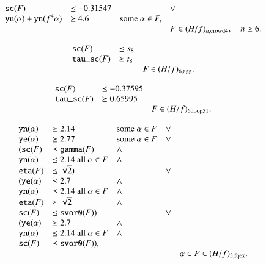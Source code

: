 \begin{equation}
    \begin{array}{lllll}
        {\operatorname{{\texttt{sc}}}}(F) &\preceq -0.31547&&\vee\\
        {\operatorname{{\texttt{yn}}}}(\alpha) + {\operatorname{{\texttt{yn}}}}(f^4\alpha) &\succeq 4.6 &\text{some
        }\alpha\in F,\\
        &&&F\in (H/f)_{n,{\operatorname{crowd4}}},\quad n\ge 6.
    \end{array}
\end{equation}

\begin{equation}
    \begin{array}{llll}
        {\operatorname{{\texttt{sc}}}}(F) &\preceq s_8\\
        {\operatorname{{\texttt{tau\_sc}}}}(F) &\succeq t_8\\
        &&F\in (H/f)_{6,{\operatorname{agg}}}.
    \end{array}
\end{equation}

\begin{equation}
    \begin{array}{llll}
        {\operatorname{{\texttt{sc}}}}(F) &\preceq -0.37595\\
        {\operatorname{{\texttt{tau\_sc}}}}(F) &\succeq 0.65995\\
        &&F\in (H/f)_{6,{\operatorname{loop51}}}.
    \end{array}
\end{equation}





\begin{equation}
    \begin{array}{lllll}
        {\operatorname{{\texttt{yn}}}}(\alpha) &\succeq 2.14 &\text{some }\alpha\in F&\vee\\
        {\operatorname{{\texttt{ye}}}}(\alpha) &\succeq 2.77 &\text{some }\alpha\in
        F&\vee\\
        ({\operatorname{{\texttt{sc}}}}(F) &\preceq {\operatorname{{\texttt{gamma}}}}(F) &\wedge\\
         {\operatorname{{\texttt{yn}}}}(\alpha) &\preceq 2.14 \text{ all }\alpha\in
         F&\wedge\\
        {\operatorname{{\texttt{eta}}}}(F) &\preceq \sqrt2) &&\vee\\
        ({\operatorname{{\texttt{ye}}}}(\alpha) &\preceq 2.7 &\wedge\\
        {\operatorname{{\texttt{yn}}}}(\alpha) &\preceq 2.14 \text{ all }\alpha\in
         F&\wedge\\
        {\operatorname{{\texttt{eta}}}}(F) &\succeq \sqrt2 &\wedge\\
        {\operatorname{{\texttt{sc}}}}(F) &\preceq {\operatorname{{\texttt{svor0}}}}(F)) &&\vee\\
        ({\operatorname{{\texttt{ye}}}}(\alpha) &\succeq 2.7 &\wedge\\
        {\operatorname{{\texttt{yn}}}}(\alpha) &\preceq 2.14 \text{ all }\alpha\in
         F&\wedge\\
        {\operatorname{{\texttt{sc}}}}(F) &\preceq {\operatorname{{\texttt{svor0}}}}(F)),\\
        &&&&\alpha\in F\in (H/f)_{3,{\operatorname{fqex}}}.
    \end{array}
\end{equation}

